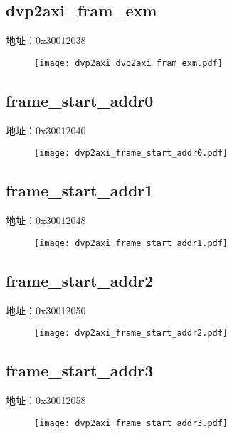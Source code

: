 \subsection{dvp2axi\_fram\_exm}
\label{dvp2axi-dvp2axi-fram-exm}
地址：0x30012038
 \begin{figure}[H]
\texttt{[image: dvp2axi\_dvp2axi\_fram\_exm.pdf]}
\end{figure}

\subsection{frame\_start\_addr0}
\label{dvp2axi-frame-start-addr0}
地址：0x30012040
 \begin{figure}[H]
\texttt{[image: dvp2axi\_frame\_start\_addr0.pdf]}
\end{figure}

\subsection{frame\_start\_addr1}
\label{dvp2axi-frame-start-addr1}
地址：0x30012048
 \begin{figure}[H]
\texttt{[image: dvp2axi\_frame\_start\_addr1.pdf]}
\end{figure}

\subsection{frame\_start\_addr2}
\label{dvp2axi-frame-start-addr2}
地址：0x30012050
 \begin{figure}[H]
\texttt{[image: dvp2axi\_frame\_start\_addr2.pdf]}
\end{figure}

\subsection{frame\_start\_addr3}
\label{dvp2axi-frame-start-addr3}
地址：0x30012058
 \begin{figure}[H]
\texttt{[image: dvp2axi\_frame\_start\_addr3.pdf]}
\end{figure}

